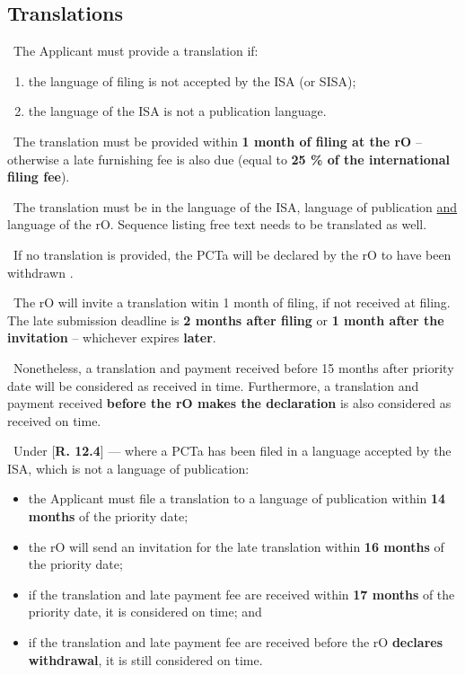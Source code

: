 \documentclass{report}
\newcommand{\n}{\newline}
\newcommand{\p}{\adforn{61} \ }
\begin{document}
\subsection{Translations}

\p The Applicant must provide a translation if:

\begin{enumerate}
 \item the language of filing is not accepted by the ISA (or SISA);
 \item the language of the ISA is not a publication language.
\end{enumerate}

\p The translation must be provided within \textbf{1 month of filing at the rO} -- otherwise a late furnishing fee is also due (equal to \textbf{25 \% of the international filing fee}). \n

\p The translation must be in the language of the ISA, language of publication \underline{and} language of the rO. Sequence listing free text needs to be translated as well. \n

\p If no translation is provided, the PCTa will be declared by the rO to have been withdrawn . \n

\p The rO will invite a translation witin 1 month of filing, if not received at filing. The late submission deadline is \textbf{2 months after filing} or \textbf{1 month after the invitation} -- whichever expires \textbf{later}. \n

\p Nonetheless, a translation and payment received before 15 months after priority date will be considered as received in time. Furthermore, a translation and payment received \textbf{before the rO makes the declaration} is also considered as received on time. \n

\p Under [\textbf{R. 12.4}] --- where a PCTa has been filed in a language accepted by the ISA, which is not a language of publication:

\begin{itemize}
 \item the Applicant must file a translation to a language of publication within \textbf{14 months} of the priority date;
 \item the rO will send an invitation for the late translation within \textbf{16 months} of the priority date;
 \item if the translation and late payment fee are received within \textbf{17 months} of the priority date, it is considered on time; and
 \item if the translation and late payment fee are received before the rO \textbf{declares withdrawal}, it is still considered on time.
\end{itemize}
\end{document}
